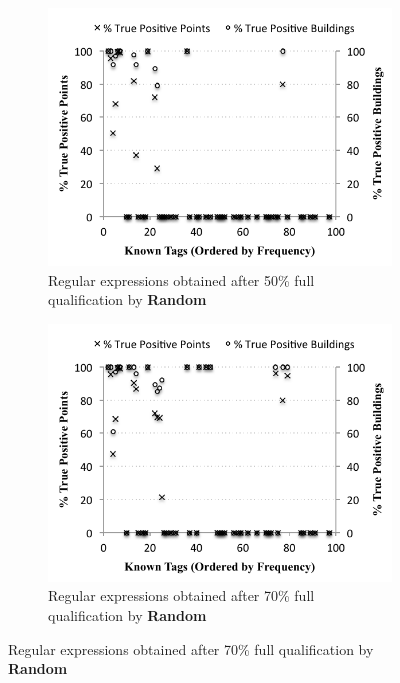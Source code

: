 \begin{figure}[ht!]
\centering
	\begin{subfigure}{0.4\textwidth}
                \centering
		\includegraphics[width=\textwidth]{./figs/recallCampusWide-50.pdf}
                \caption{Regular expressions obtained after 50\% full qualification by {\bf Random}}
		\label{fig:full50}
	\end{subfigure}
	\begin{subfigure}{0.4\textwidth}
                \centering
		\includegraphics[width=\textwidth]{./figs/recallCampusWide-70.pdf}
                \caption{Regular expressions obtained after 70\% full qualification by {\bf Random}}
		\label{fig:full70}
	\end{subfigure}

\end{figure}
